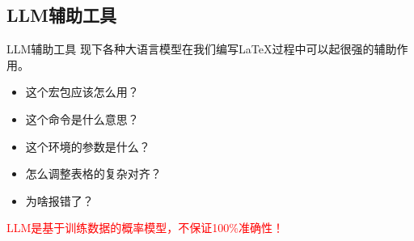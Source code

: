 \subsection{LLM辅助工具}
\begin{frame}[fragile]{LLM辅助工具}
  现下各种大语言模型在我们编写\LaTeX{}过程中可以起很强的辅助作用。
  \begin{itemize}
    \item 这个宏包应该怎么用？
    \item 这个命令是什么意思？
    \item 这个环境的参数是什么？
    \item 怎么调整表格的复杂对齐？
    \item 为啥报错了？
  \end{itemize}
  \textcolor{red}{LLM是基于训练数据的概率模型，不保证100\%准确性！}
\end{frame}

